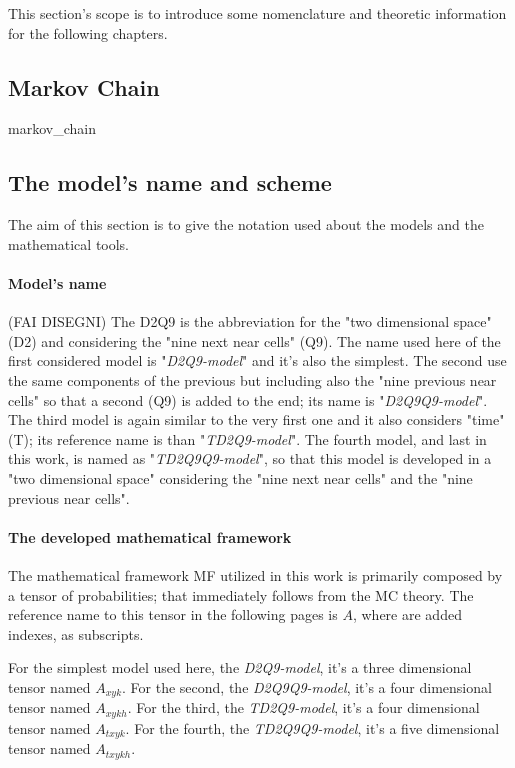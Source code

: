 \documentclass[class=article, crop=false]{standalone}
\begin{document}
This section's scope is to introduce some nomenclature and theoretic information for the following chapters.

\subsection{Markov Chain} %
	{markov_chain}
	

\FloatBarrier
\subsection{The model's name and scheme}
The aim of this section is to give the notation used about the models and the mathematical tools.

\paragraph{Model's name} (FAI DISEGNI)
The D2Q9 is the abbreviation for the "two dimensional space" (D2) and considering the "nine next near cells" (Q9).
The name used here of the first considered model is "\emph{D2Q9-model}" and it's also the simplest.
The second use the same components of the previous but including also the "nine previous near cells" so that a second (Q9) is added to the end; its name is "\emph{D2Q9Q9-model}".
The third model is again similar to the very first one and it also considers "time" (T); its reference name is than "\emph{TD2Q9-model}".
The fourth model, and last in this work, is named as "\emph{TD2Q9Q9-model}", so that this model is developed in a "two dimensional space" considering the "nine next near cells" and the "nine previous near cells".


\paragraph{The developed mathematical framework}
The mathematical framework MF utilized in this work is primarily composed by a tensor of probabilities; that immediately follows from the MC theory.
The reference name to this tensor in the following pages is $A$, where are added indexes, as subscripts.

For the simplest model used here, the \emph{D2Q9-model}, it's a three dimensional tensor named $A_{x y k}$.
For the second, the \emph{D2Q9Q9-model}, it's a four dimensional tensor named $A_{x y k h}$.
For the third, the \emph{TD2Q9-model}, it's a four dimensional tensor named $A_{t x y k}$.
For the fourth, the \emph{TD2Q9Q9-model}, it's a five dimensional tensor named $A_{t x y k h}$.


\end{document}
